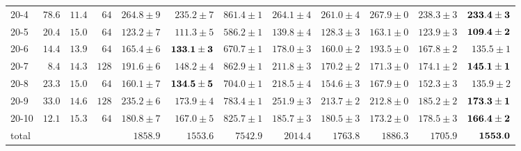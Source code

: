\documentclass[letterpaper]{article}
\newcommand{\G}{\cellcolor[gray]{0.75}}
\begin{document}
\begin{table}[t]
{\begin{minipage}{7.3in}
\begin{tabular}{l@{}rr@{}r rr rrr rrr}
      20-4  & $78.6$ & $11.4$ & $64$ &    $264.8\pm9$ &    $235.2\pm7$ &    $861.4\pm1$ &    $264.1\pm4$ &    $261.0\pm4$ &    $267.9\pm0$ &    $238.3\pm3$ &\G$\bf233.4\pm3$\\
      20-5  & $20.4$ & $15.0$ & $64$ &    $123.2\pm7$ &    $111.3\pm5$ &    $586.2\pm1$ &    $139.8\pm4$ &    $128.3\pm3$ &    $163.1\pm0$ &    $123.9\pm3$ &\G$\bf109.4\pm2$\\
      20-6  & $14.4$ & $13.9$ & $64$ &    $165.4\pm6$ &$\bf 133.1\pm3$ &    $670.7\pm1$ &    $178.0\pm3$ &    $160.0\pm2$ &    $193.5\pm0$ &    $167.8\pm2$ &\G  $135.5\pm1$ \\
      20-7  & $ 8.4$ & $14.3$ & $128$&    $191.6\pm6$ &    $148.2\pm4$ &    $862.9\pm1$ &    $211.8\pm3$ &    $170.2\pm2$ &    $171.3\pm0$ &    $174.1\pm2$ &\G$\bf145.1\pm1$\\
      20-8  & $23.3$ & $15.0$ & $64$ &    $160.1\pm7$ &$\bf 134.5\pm5$ &    $704.0\pm1$ &    $218.5\pm4$ &    $154.6\pm3$ &    $167.9\pm0$ &    $152.3\pm3$ &\G  $135.9\pm2$ \\
      20-9  & $33.0$ & $14.6$ & $128$&    $235.2\pm6$ &    $173.9\pm4$ &    $783.4\pm1$ &    $251.9\pm3$ &    $213.7\pm2$ &    $212.8\pm0$ &    $185.2\pm2$ &\G$\bf173.3\pm1$\\
      20-10 & $12.1$ & $15.3$ & $64$ &    $180.8\pm7$ &    $167.0\pm5$ &    $825.7\pm1$ &    $185.7\pm3$ &    $180.5\pm3$ &    $173.2\pm0$ &    $178.5\pm3$ &\G$\bf166.4\pm2$\\
      total &        &      &        &       $1858.9$ &       $1553.6$ &       $7542.9$ &       $2014.4$ &       $1763.8$ &       $1886.3$ &       $1705.9$ &\G$\bf  1553.0$ \\

\end{tabular}
\end{minipage}}
\end{table}
\end{document}

